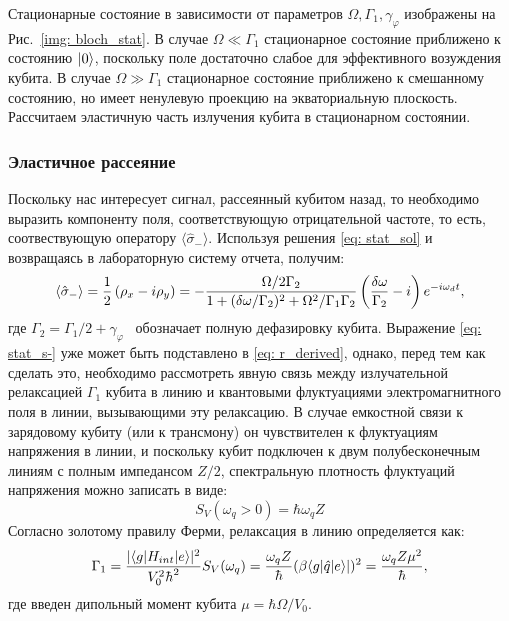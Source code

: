Стационарные состояние в зависимости от параметров $\Omega, \Gamma_1, \gamma_\varphi$ изображены на Рис.~\ref{img: bloch_stat}. В случае $\Omega\!\ll\!\Gamma_1$ стационарное состояние приближено к состоянию $\ket{0}$, поскольку поле достаточно слабое для эффективного возуждения кубита. В случае $\Omega\!\gg\!\Gamma_1$ стационарное состояние приближено к смешанному состоянию, но имеет ненулевую проекцию на экваториальную плоскость. Рассчитаем эластичную часть излучения кубита в стационарном состоянии.

\subsubsection{Эластичное рассеяние}
Поскольку нас интересует сигнал, рассеянный кубитом назад, то необходимо выразить компоненту поля, соответствующую отрицательной частоте, то есть, соотвествующую оператору $\langle\hat{\sigma}_- \rangle$. Используя решения \eqref{eq: stat_sol} и возвращаясь в лабораторную систему отчета, получим:
\begin{equation}
\braket{\hat{\sigma}_-} = \frac{1}{2}\left(\rho_x-i\rho_y\right) = -\frac{\Omega/2\Gamma_2}{1+(\delta\omega/\Gamma_2)^2+\Omega^2/\Gamma_1\Gamma_2}\left(\frac{\delta\omega}{\Gamma_2}-i\right)e^{-i\omega_d t},
\label{eq: stat_s-}
\end{equation} 
где $\Gamma_2 = \Gamma_1/2
 + \gamma_\varphi$~ обозначает полную дефазировку кубита. Выражение \eqref{eq: stat_s-} уже может быть подставлено в \eqref{eq: r_derived}, однако, перед тем как сделать это, необходимо рассмотреть явную связь между излучательной релаксацией $\Gamma_1$ кубита в линию и квантовыми флуктуациями электромагнитного поля в линии, вызывающими эту релаксацию. В случае емкостной связи к зарядовому кубиту (или к трансмону) он чувствителен к флуктуациям напряжения в линии, и поскольку кубит подключен к двум полубесконечным линиям с полным импедансом $Z/2$, спектральную плотность флуктуаций напряжения можно записать в виде:
\begin{equation}
S_{V}(\omega_q>0)=\hbar \omega_q Z
\end{equation}
Согласно золотому правилу Ферми, релаксация в линию определяется \cite{nazarov2002quantum} как:
\begin{equation}\label{eq: G1}
\Gamma_1 = \frac{|\!\braket{g|H_{int}|e}\!|^2}{V_0^2\hbar^2}S_V(\omega_q) = \frac{\omega_q Z}{\hbar}(\beta \langle{g|\hat{q}|e}\rangle|)^2 = \frac{\omega_q Z \mu^2}{\hbar}, 
\end{equation}
где введен дипольный момент кубита $\mu=\hbar\Omega/V_0$.

